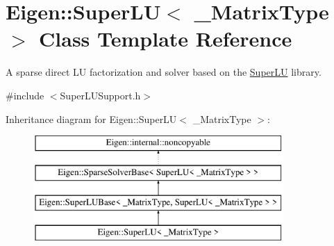 \hypertarget{class_eigen_1_1_super_l_u}{}\section{Eigen\+::Super\+LU$<$ \+\_\+\+Matrix\+Type $>$ Class Template Reference}
\label{class_eigen_1_1_super_l_u}


A sparse direct LU factorization and solver based on the \mbox{\hyperlink{class_eigen_1_1_super_l_u}{Super\+LU}} library.  




{\ttfamily \#include $<$Super\+L\+U\+Support.\+h$>$}

Inheritance diagram for Eigen\+::Super\+LU$<$ \+\_\+\+Matrix\+Type $>$\+:\begin{figure}[H]
\begin{center}
\leavevmode
\includegraphics[height=4.000000cm]{class_eigen_1_1_super_l_u}
\end{center}
\end{figure}
